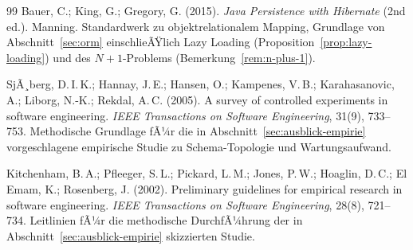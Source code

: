 ﻿\documentclass[a4paper,12pt]{report}
\theoremstyle{definition}
\theoremstyle{remark}
\begin{document}
\begin{thebibliography}{99}
Bauer, C.; King, G.; Gregory, G. (2015).
\newblock \emph{Java Persistence with Hibernate} (2nd ed.).
\newblock Manning.
\newblock Standardwerk zu objektrelationalem Mapping,
Grundlage von Abschnitt~\ref{sec:orm} einschlieÃŸlich Lazy Loading
(Proposition~\ref{prop:lazy-loading}) und des
$N{+}1$-Problems (Bemerkung~\ref{rem:n-plus-1}).


SjÃ¸berg, D.\,I.\,K.; Hannay, J.\,E.; Hansen, O.; Kampenes, V.\,B.;
Karahasanovic, A.; Liborg, N.-K.; Rekdal, A.\,C. (2005).
\newblock A survey of controlled experiments in software engineering.
\newblock \emph{IEEE Transactions on Software Engineering}, 31(9), 733--753.
\newblock Methodische Grundlage fÃ¼r die in
Abschnitt~\ref{sec:ausblick-empirie} vorgeschlagene empirische Studie
zu Schema-Topologie und Wartungsaufwand.

Kitchenham, B.\,A.; Pfleeger, S.\,L.; Pickard, L.\,M.; Jones, P.\,W.;
Hoaglin, D.\,C.; El Emam, K.; Rosenberg, J. (2002).
\newblock Preliminary guidelines for empirical research in software
engineering.
\newblock \emph{IEEE Transactions on Software Engineering}, 28(8), 721--734.
\newblock Leitlinien fÃ¼r die methodische DurchfÃ¼hrung der in
Abschnitt~\ref{sec:ausblick-empirie} skizzierten Studie.


\end{thebibliography}
\end{document}
